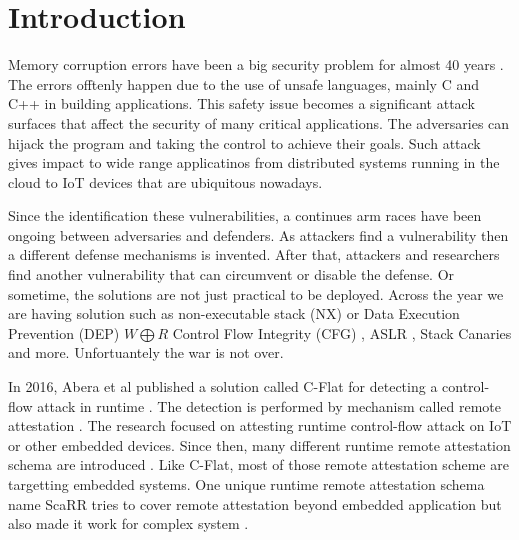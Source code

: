 
\chapter{Introduction} %

\label{Chapter1} %

Memory corruption errors have been a big security problem for almost 40 years
\cite{szekeresSoKEternalWar2013,vanderveenMemoryErrorsPresent2012}. The errors
offtenly happen due to the use of unsafe languages, mainly C and C++ in building
applications. This safety issue becomes a significant attack surfaces that
affect the security of many critical applications. The adversaries can hijack
the program and taking the control to achieve their goals. Such attack gives
impact to wide range applicatinos from distributed systems running in the cloud
to IoT devices that are ubiquitous nowadays.

Since the identification these vulnerabilities, a continues arm races have been
ongoing between adversaries and defenders. As attackers find a vulnerability
then a different defense mechanisms is invented. After that, attackers and
researchers find another vulnerability that can circumvent or disable the
defense. Or sometime, the solutions are not just practical to be deployed.
Across the year we are having solution such as non-executable stack (NX) or Data
Execution Prevention (DEP)  \( W \bigoplus R \)
\cite{vanderveenMemoryErrorsPresent2012} Control Flow Integrity (CFG)
\cite{abadiControlFlowIntegrityPrinciples2005}, ASLR
\cite{kilAddressSpaceLayout2006}, Stack Canaries
\cite{baratlooTransparentRunTimeDefense2000} and more. Unfortuantely the war is
not over.

In 2016, Abera et al published a solution called C-Flat for detecting a
control-flow attack in runtime \cite{aberaCFLATControlFlowAttestation2016}. The
detection is performed by mechanism called remote attestation
\cite{haldarSemanticRemoteAttestationA2004}. The research focused on attesting
runtime control-flow attack on IoT or other embedded devices. Since then, many
different runtime remote attestation schema are introduced
\cite{dessoukyLOFATLowOverheadControl2017, zeitouniATRIUMRuntimeAttestation2017,
kohnhauserSCAPIScalableAttestation2017,
dessoukyLiteHAXLightweightHardwareassisted2018, aberaDIATDataIntegrity2019,
koutroumpouchosSecureEdgeComputing2019, sunOATAttestingOperation2020}. Like
C-Flat, most of those remote attestation scheme are targetting embedded systems.
One unique runtime remote attestation schema name ScaRR tries to cover remote
attestation beyond embedded application but also made it work for complex system
\cite{toffaliniScaRRScalableRuntime2019}. 

